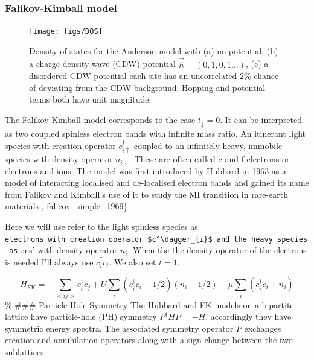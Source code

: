 \hypertarget{falikov-kimball-model}{%
\subsubsection{Falikov-Kimball model}\label{falikov-kimball-model}}

\begin{figure}
  \centering
    \texttt{[image: figs/DOS]}
  \caption{Density of states for the Anderson model with (a) no potential, (b) a charge density wave (CDW) potential $\vec{h} = (0,1,0,1...)$, (c) a disordered CDW potential each site has an uncorrelated $2\%$ chance of deviating from the CDW background. Hopping and potential terms both have unit magnitude.}
  \label{fig:fk_dos}
\end{figure}

The Falikov-Kimball model corresponds to the case
\(t_{\downarrow} = 0\). It can be interpreted as two coupled spinless
electron bands with infinite mass ratio. An itinerant light species with
creation operator \(c^\dagger_{i\uparrow}\) coupled to an infinitely
heavy, immobile species with density operator \(n_{i\downarrow}\). These
are often called c and f electrons or electrons and ions. The model was
first introduced by Hubbard in 1963 as a model of interacting localised
and de-localised electron bands and gained its name from Falikov and
Kimball's use of it to study the MI transition in rare-earth materials
\textcite{hubbard_j._electron_1963}, falicov\_simple\_1969\}.

Here we will use refer to the light spinless species as
\texttt{electrons\textquotesingle{}\ with\ creation\ operator\ \$c\^{}\textbackslash{}dagger\_\{i\}\$\ and\ the\ heavy\ species\ as}ions'
with density operator \(n_i\). When the the density operator of the
electrons is needed I'll always use \(c^\dagger_{i}c_{i}\). We also set
\(t = 1\).

\[
    H_{\mathrm{FK}} = -\sum_{<ij>} c^\dagger_{i}c_{j} + U \sum_{i} (c^\dagger_{i}c_{i} - 1/2)( n_i - 1/2) - \mu \sum_i \left(c^\dagger_{i}c_{i} + n_{i}\right)
\] \% \#\#\# Particle-Hole Symmetry The Hubbard and FK models on a
bipartite lattice have particle-hole (PH) symmetry
\(P^\dagger H P = - H\), accordingly they have symmetric energy spectra.
The associated symmetry operator \(P\) exchanges creation and
annihilation operators along with a sign change between the two
sublattices.

